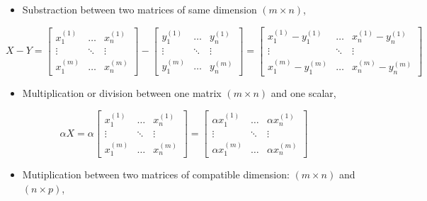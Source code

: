 \begin{itemize}
  \item Substraction between two matrices of same dimension $(m \times n)$,
\end{itemize}

$$
X - Y = 
\begin{bmatrix} 
x_{1}^{(1)} & \dots & x_{n}^{(1)}  \\ 
\vdots & \ddots & \vdots \\ 
x_{1}^{(m)} & \dots & x_{n}^{(m)} 
\end{bmatrix} - 
\begin{bmatrix} 
y_{1}^{(1)} & \dots & y_{n}^{(1)}  \\ 
\vdots & \ddots & \vdots \\ 
y_{1}^{(m)} & \dots & y_{n}^{(m)} 
\end{bmatrix} = 
\begin{bmatrix} 
x_{1}^{(1)} - y_{1}^{(1)}  & \dots & x_{n}^{(1)} - y_{n}^{(1)}  \\ 
\vdots & \ddots & \vdots \\ 
x_{1}^{(m)} - y_{1}^{(m)} & \dots & x_{n}^{(m)} - y_{n}^{(m)}
\end{bmatrix}
$$

\begin{itemize}
  \item Multiplication or division between one matrix $(m \times n)$ and one scalar,
\end{itemize}

$$
\alpha X = 
\alpha \begin{bmatrix} 
x_{1}^{(1)} & \dots & x_{n}^{(1)}  \\ 
\vdots & \ddots & \vdots \\ 
x_{1}^{(m)} & \dots & x_{n}^{(m)} 
\end{bmatrix} 
= 
\begin{bmatrix} 
\alpha x_{1}^{(1)}  & \dots & \alpha x_{n}^{(1)}  \\ 
\vdots & \ddots & \vdots \\ 
\alpha x_{1}^{(m)} & \dots & \alpha x_{n}^{(m)}
\end{bmatrix}
$$

\newpage

\begin{itemize}
  \item Mutiplication between two matrices of compatible dimension: $(m \times n)$ and $(n \times p)$,
\end{itemize}

